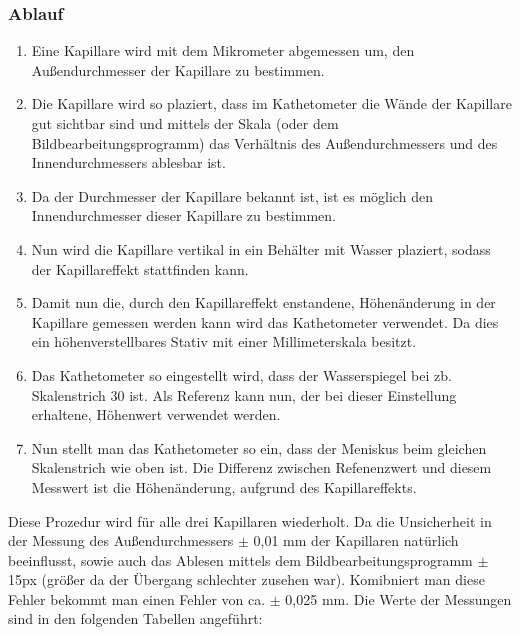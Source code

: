 \documentclass[11pt]{scrartcl}
\begin{document}
\subsubsection{Ablauf}
\begin{enumerate}
    \item Eine Kapillare wird mit dem Mikrometer abgemessen um, den Außendurchmesser
        der Kapillare zu bestimmen.
    \item Die Kapillare wird so plaziert, dass im Kathetometer die Wände
        der Kapillare gut sichtbar sind und mittels der Skala (oder dem
        Bildbearbeitungsprogramm) das Verhältnis des Außendurchmessers und
        des Innendurchmessers ablesbar ist.
    \item Da der Durchmesser der Kapillare bekannt ist, ist es möglich den
        Innendurchmesser dieser Kapillare zu bestimmen.
    \item Nun wird die Kapillare vertikal in ein Behälter mit Wasser plaziert,
        sodass der Kapillareffekt stattfinden kann.
    \item Damit nun die, durch den Kapillareffekt enstandene, Höhenänderung
        in der Kapillare gemessen werden kann wird das Kathetometer verwendet.
        Da dies ein höhenverstellbares Stativ mit einer Millimeterskala besitzt.
    \item Das Kathetometer so eingestellt wird, dass der Wasserspiegel
        bei zb. Skalenstrich 30 ist. Als Referenz kann nun, der bei dieser 
        Einstellung erhaltene, Höhenwert verwendet werden.
    \item Nun stellt man das Kathetometer so ein, dass der Meniskus beim
        gleichen Skalenstrich wie oben ist. Die Differenz zwischen Refenenzwert 
        und diesem Messwert ist die Höhenänderung, aufgrund des Kapillareffekts.
\end{enumerate}

Diese Prozedur wird für alle drei Kapillaren wiederholt.
Da die Unsicherheit in der Messung des Außendurchmessers $\pm$ 0,01 mm
der Kapillaren natürlich
beeinflusst, sowie auch das Ablesen mittels dem Bildbearbeitungsprogramm $\pm$ 15px 
(größer da der Übergang schlechter zusehen war). Komibniert man diese Fehler bekommt
man einen Fehler von ca. $\pm$ 0,025 mm.
Die Werte der Messungen sind in den folgenden Tabellen angeführt: 
\end{document}
